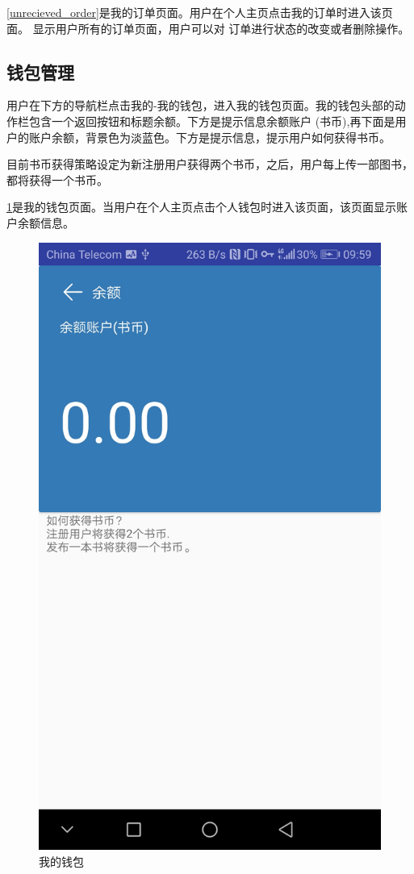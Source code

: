 \cref{unrecieved_order}是我的订单页面。用户在个人主页点击我的订单时进入该页面。
显示用户所有的订单页面，用户可以对
订单进行状态的改变或者删除操作。



\subsection{钱包管理}
用户在下方的导航栏点击我的-我的钱包，进入我的钱包页面。我的钱包头部的动作栏包含一个返回按钮和标题余额。下方是提示信息余额账户
(书币),再下面是用户的账户余额，背景色为淡蓝色。下方是提示信息，提示用户如何获得书币。

目前书币获得策略设定为新注册用户获得两个书币，之后，用户每上传一部图书，都将获得一个书币。

\cref{balance}是我的钱包页面。当用户在个人主页点击个人钱包时进入该页面，该页面显示账户余额信息。

\begin{figure}[h]
	\centering
	\includegraphics[scale=0.09]{Chapters/UI/balance.jpg}
	\caption{我的钱包}
	\label{balance}
\end{figure}

